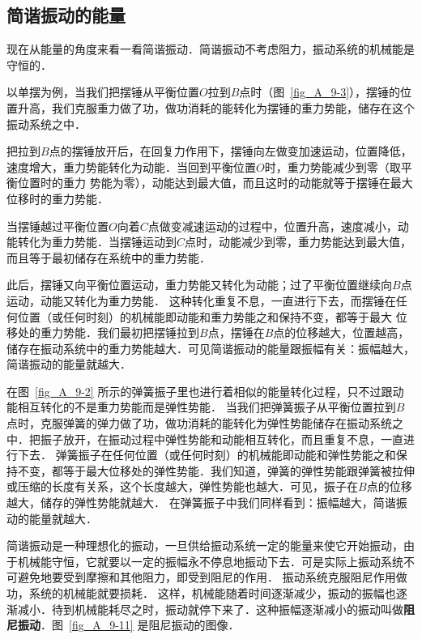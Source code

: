 \subsection{简谐振动的能量}

现在从能量的角度来看一看简谐振动．简谐振动不考虑阻力，振动系统的机械能是守恒的．

以单摆为例，当我们把摆锤从平衡位置$O$拉到$B$点时（图~\ref{fig_A_9-3}），摆锤的位置升高，我们克服重力做了功，做功消耗的能转化为摆锤的重力势能，储存在这个振动系统之中．

把拉到$B$点的摆锤放开后，在回复力作用下，摆锤向左做变加速运动，位置降低，速度增大，重力势能转化为动能．当回到平衡位置$O$时，重力势能减少到零（取平衡位置时的重力
势能为零），动能达到最大值，而且这时的动能就等于摆锤在最大位移时的重力势能．

当摆锤越过平衡位置$O$向着$C$点做变减速运动的过程中，位置升高，速度减小，动能转化为重力势能．当摆锤运动到$C$点时，动能减少到零，重力势能达到最大值，而且等于最初储存在系统中的重力势能．

此后，摆锤又向平衡位置运动，重力势能又转化为动能；过了平衡位置继续向$B$点运动，动能又转化为重力势能．
这种转化重复不息，一直进行下去，而摆锤在任何位置（或任何时刻）的机械能即动能和重力势能之和保持不变，都等于最大
位移处的重力势能．我们最初把摆锤拉到$B$点，摆锤在$B$点的位移越大，位置越高，储存在振动系统中的重力势能越大．可见简谐振动的能量跟振幅有关：振幅越大，简谐振动的能量就越大．

在图~\ref{fig_A_9-2} 所示的弹簧振子里也进行着相似的能量转化过程，只不过跟动能相互转化的不是重力势能而是弹性势能．
当我们把弹簧振子从平衡位置拉到$B$点时，克服弹簧的弹力做了功，做功消耗的能转化为弹性势能储存在振动系统之中．把振子放开，在振动过程中弹性势能和动能相互转化，而且重复不息，一直进行下去．
弹簧振子在任何位置（或任何时刻）的机械能即动能和弹性势能之和保持不变，都等于最大位移处的弹性势能．我们知道，弹簧的弹性势能跟弹簧被拉伸或压缩的长度有关系，这个长度越大，弹性势能也越大．可见，振子在$B$点的位移越大，储存的弹性势能就越大．
在弹簧振子中我们同样看到：振幅越大，简谐振动的能量就越大．

简谐振动是一种理想化的振动，一旦供给振动系统一定的能量来使它开始振动，由于机械能守恒，它就要以一定的振幅永不停息地振动下去．可是实际上振动系统不可避免地要受到摩擦和其他阻力，即受到阻尼的作用．
振动系统克服阻尼作用做功，系统的机械能就要损耗．
这样，机械能随着时间逐渐减少，振动的振幅也逐渐减小．待到机械能耗尽之时，振动就停下来了．这种振幅逐渐减小的振动叫做\textbf{阻尼振动}．图~\ref{fig_A_9-11} 是阻尼振动的图像．

